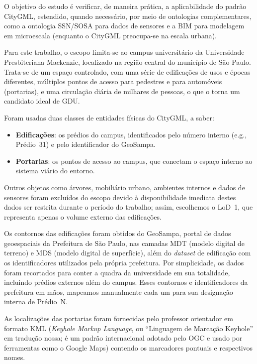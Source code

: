 \documentclass[
  article,   %
  11pt,      %
  oneside,   %
  a4paper,   %
  english,   %
  brazil,    %
  sumario=tradicional
]{abntex2}
\newcommand{\en}[1]{\foreignlanguage{english}{\textit{#1}}}
\begin{document}
O objetivo do estudo é verificar, de maneira prática, a aplicabilidade do padrão CityGML,
estendido, quando necessário, por meio de ontologias complementares, como a ontologia SSN/SOSA para
dados de sensores e a BIM para modelagem em microescala (enquanto o CityGML preocupa-se na escala
urbana).

Para este trabalho, o escopo limita-se ao campus universitário da Universidade Presbiteriana
Mackenzie, localizado na região central do município de São Paulo.
Trata-se de um espaço controlado, com uma série de edificações de usos e épocas diferentes,
múltiplos pontos de acesso para pedestres e para automóveis (portarias), e uma circulação diária de
milhares de pessoas, o que o torna um candidato ideal de GDU.

Foram usadas duas classes de entidades físicas do CityGML, a saber:

\begin{itemize}
  \item \textbf{Edificações}: os prédios do campus, identificados pelo número interno (e.g., Prédio~31) e pelo identificador do GeoSampa.
  \item \textbf{Portarias}: os pontos de acesso ao campus, que conectam o espaço interno ao sistema viário do entorno.
\end{itemize}

Outros objetos como árvores, mobiliário urbano, ambientes internos e dados de sensores foram
excluídos do escopo devido à disponibilidade imediata destes dados ser restrita durante o período
do trabalho; assim, escolhemos o LoD~1, que representa apenas o volume externo das edificações.

Os contornos das edificações foram obtidos do GeoSampa, portal de dados geoespaciais da Prefeitura
de São Paulo, nas camadas MDT (modelo digital de terreno) e MDS (modelo digital de superfície),
além do \en{dataset} de edificação com os identificadores utilizados pela própria prefeitura.
Por simplicidade, os dados foram recortados para conter a quadra da universidade em sua totalidade,
incluindo prédios externos além do campus.
Esses contornos e identificadores da prefeitura em mãos, mapeamos manualmente cada um para sua
designação interna de Prédio~N.

As localizações das portarias foram fornecidas pelo professor orientador em formato KML
(\en{Keyhole Markup Language}, ou ``Linguagem de Marcação Keyhole'' em tradução nossa; é um padrão
internacional adotado pelo OGC e usado por ferramentas como o Google Maps) contendo os marcadores
pontuais e respectivos nomes.
\end{document}
